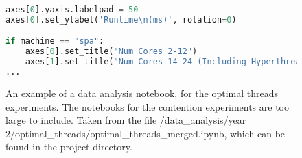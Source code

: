 \begin{appendices}
\begin{figure}
\begin{lstlisting}[language=python]
axes[0].yaxis.labelpad = 50
axes[0].set_ylabel('Runtime\n(ms)', rotation=0)

if machine == "spa":
    axes[0].set_title("Num Cores 2-12")
    axes[1].set_title("Num Cores 14-24 (Including Hyperthreads)")
...
\end{lstlisting}
\caption{An example of a data analysis notebook, for the optimal threads experiments. The notebooks for the contention experiments are too large to include. Taken from the file /data\_analysis/year 2/optimal\_threads/optimal\_threads\_merged.ipynb, which can be found in the project directory.}
\label{fig:data_analysis_program}
\end{figure}



\end{appendices}